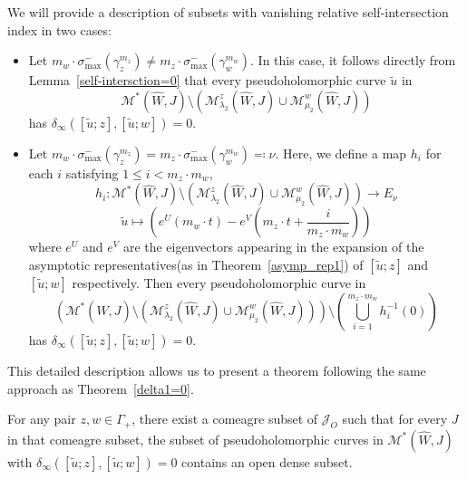 \documentclass[11pt, a4paper]{amsart}
\newcommand{\cJ}{\mathcal{J}}
\newcommand{\cM}{\mathcal{M}}
\begin{document}
We will provide a description of subsets with vanishing relative self-intersection index in two cases: 
\begin{itemize}
    \item[Case 1:]  Let $m_w\cdot \sigma^-_{\max}(\gamma_z^{m_z}) \neq m_z \cdot \sigma^-_{\max}(\gamma_w^{m_w})$. In this case, it follows directly from Lemma~\ref{self-intersction=0} that every pseudoholomorphic curve $\tilde{u}$ in
    $$\cM^*(\widehat{W},J)\setminus \left(\cM^z_{\lambda_2}(\widehat{W},J) \cup \cM^w_{\mu_2}(\widehat{W},J)\right)$$
    has $\delta_{\infty}([\tilde{u}; z],[\tilde{u};w])=0$.
    \item[Case 2:] Let $m_w\cdot \sigma^-_{\max}(\gamma_z^{m_z}) = m_z \cdot \sigma^-_{\max}(\gamma_w^{m_w}) \eqqcolon \nu$. Here, we define a map $h_i$ for each $i$ satisfying $1\leq i < m_z\cdot m_w$, 
    $$h_i: \cM^*(\widehat{W},J)\setminus \left(\cM^z_{\lambda_2}(\widehat{W},J) \cup \cM^w_{\mu_2}(\widehat{W},J)\right) \rightarrow E_{\nu}$$
$$\tilde{u} \mapsto (e^{U}(m_w\cdot t) - e^{V}(m_z\cdot t + \frac{i}{m_z\cdot m_w}))$$
where $e^U$ and $e^V$ are the eigenvectors appearing in the expansion of the asymptotic representatives(as in  Theorem~\ref{asymp_rep1}) of $[\tilde{u};z]$ and $[\tilde{u};w]$ respectively. Then every pseudoholomorphic curve in 
$$\left( \cM^*(\widehat{W},J)\setminus \left(\cM^z_{\lambda_2}(\widehat{W},J) \cup \cM^w_{\mu_2}(\widehat{W},J)\right) \right) \setminus (\bigcup\limits_{i=1}^{m_z\cdot m_w}h_i^{-1}(0))$$
has $\delta_{\infty}([\tilde{u}; z],[\tilde{u};w])=0$. 
\end{itemize}
This detailed description allows us to present a theorem following the same approach as Theorem~\ref{delta1=0}.

\begin{theorem} \label{delta_rel=0}
For any pair $z,w\in \Gamma_+$, there exist a comeagre subset of $\cJ_O$ such that for every $J$ in that comeagre subset, the subset of pseudoholomorphic curves in $\cM^*(\widehat{W},J)$ with $\delta_{\infty}([\tilde{u}; z], [\tilde{u};w])=0$ contains an open dense subset.

\end{theorem}
\end{document}
